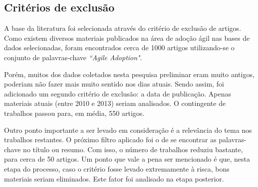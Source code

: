 		\subsection{Critérios de exclusão}
			A base da literatura foi selecionada através do critério de exclusão de artigos. Como existem diversos materiais publicados na área de adoção ágil nas bases de dados selecionadas, foram encontrados cerca de 1000 artigos utilizando-se o conjunto de palavras-chave \textit{``Agile Adoption"}.

			Porém, muitos dos dados coletados nesta pesquisa preliminar eram muito antigos, poderiam não fazer mais muito sentido nos dias atuais. Sendo assim, foi adicionado um segundo critério de exclusão: a data de publicação. Apenas materiais atuais (entre 2010 e 2013) seriam analisados. O contingente de trabalhos passou para, em média, 550 artigos.

			Outro ponto importante a ser levado em consideração é a relevância do tema nos trabalhos restantes. O próximo filtro aplicado foi o de se encontrar as palavras-chave no título ou resumo. Com isso, o número de trabalhos reduziu bastante, para cerca de 50 artigos. Um ponto que vale a pena ser mencionado é que, nesta etapa do processo, caso o critério fosse levado extremamente à risca, bons materiais seriam eliminados. Este fator foi analisado na etapa posterior.

